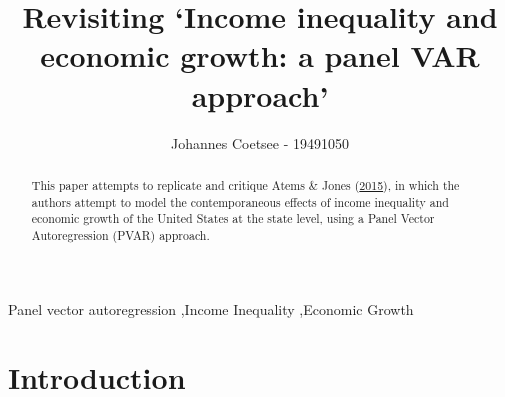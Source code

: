 \documentclass[11pt,preprint, authoryear]{elsarticle}
\numberwithin{equation}{section}
\numberwithin{figure}{section}
\numberwithin{table}{section}
\begin{document}
\begin{frontmatter}  %

\title{Revisiting `Income inequality and economic growth: a panel VAR approach'}





\author[Add1]{Johannes Coetsee - 19491050}





\address[Add1]{Stellenbosch University}


\begin{abstract}
\small{
This paper attempts to replicate and critique Atems \& Jones
(\protect\hyperlink{ref-atems}{2015}), in which the authors attempt to
model the contemporaneous effects of income inequality and economic
growth of the United States at the state level, using a Panel Vector
Autoregression (PVAR) approach.
}
\end{abstract}

\vspace{1cm}

\begin{keyword}
\footnotesize{
Panel vector autoregression \sep Income Inequality \sep Economic Growth \\ \vspace{0.3cm}
\textit{} 
}
\end{keyword}
\vspace{0.5cm}
\end{frontmatter}



\pagestyle{fancy}
\chead{}
\lfoot{}
\lhead{}
\cfoot{}


\headsep 35pt %




\hypertarget{introduction}{%
\section{\texorpdfstring{Introduction
\label{Introduction}}{Introduction }}\label{introduction}}
\end{document}
